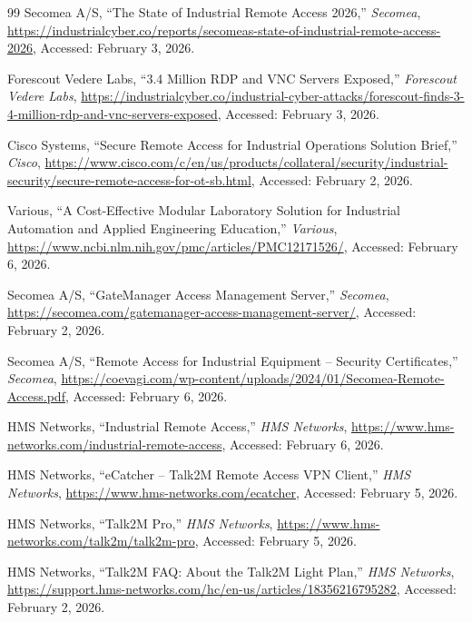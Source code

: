 \begin{thebibliography}{99}
Secomea A/S, ``The State of Industrial Remote Access 2026,'' \textit{Secomea}, \url{https://industrialcyber.co/reports/secomeas-state-of-industrial-remote-access-2026}, Accessed: February 3, 2026.

Forescout Vedere Labs, ``3.4 Million RDP and VNC Servers Exposed,'' \textit{Forescout Vedere Labs}, \url{https://industrialcyber.co/industrial-cyber-attacks/forescout-finds-3-4-million-rdp-and-vnc-servers-exposed}, Accessed: February 3, 2026.

Cisco Systems, ``Secure Remote Access for Industrial Operations Solution Brief,'' \textit{Cisco}, \url{https://www.cisco.com/c/en/us/products/collateral/security/industrial-security/secure-remote-access-for-ot-sb.html}, Accessed: February 2, 2026.

Various, ``A Cost-Effective Modular Laboratory Solution for Industrial Automation and Applied Engineering Education,'' \textit{Various}, \url{https://www.ncbi.nlm.nih.gov/pmc/articles/PMC12171526/}, Accessed: February 6, 2026.

Secomea A/S, ``GateManager Access Management Server,'' \textit{Secomea}, \url{https://secomea.com/gatemanager-access-management-server/}, Accessed: February 2, 2026.

Secomea A/S, ``Remote Access for Industrial Equipment -- Security Certificates,'' \textit{Secomea}, \url{https://coevagi.com/wp-content/uploads/2024/01/Secomea-Remote-Access.pdf}, Accessed: February 6, 2026.

HMS Networks, ``Industrial Remote Access,'' \textit{HMS Networks}, \url{https://www.hms-networks.com/industrial-remote-access}, Accessed: February 6, 2026.

HMS Networks, ``eCatcher -- Talk2M Remote Access VPN Client,'' \textit{HMS Networks}, \url{https://www.hms-networks.com/ecatcher}, Accessed: February 5, 2026.

HMS Networks, ``Talk2M Pro,'' \textit{HMS Networks}, \url{https://www.hms-networks.com/talk2m/talk2m-pro}, Accessed: February 5, 2026.

HMS Networks, ``Talk2M FAQ: About the Talk2M Light Plan,'' \textit{HMS Networks}, \url{https://support.hms-networks.com/hc/en-us/articles/18356216795282}, Accessed: February 2, 2026.


\end{thebibliography}
